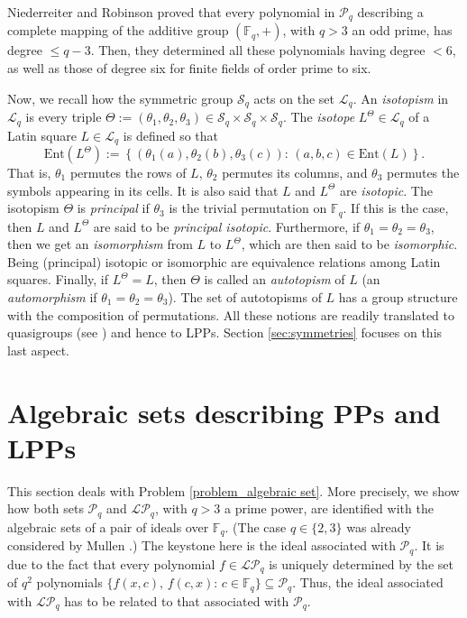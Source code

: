 \documentclass[pdflatex,sn-mathphys-num]{sn-jnl}
\theoremstyle{thmstyleone}%
\begin{document}
\vspace{0.2cm}

Niederreiter  and Robinson \cite{Niederreiter1982} proved that every polynomial in $\mathcal{P}_q$ describing a complete mapping of the additive group $(\mathbb{F}_q,+)$, with $q>3$ an odd prime, has degree $\leq q-3$. Then, they determined all these polynomials having degree $<6$, as well as those of degree six for finite fields of order prime to six. 

\vspace{0.2cm}

Now, we recall how the symmetric group $\mathcal{S}_q$ acts on the set $\mathcal{L}_q$. An {\em isotopism} in $\mathcal{L}_q$ is every triple $\Theta:=(\theta_1,\theta_2,\theta_3)\in\mathcal{S}_q\times \mathcal{S}_q\times\mathcal{S}_q$. The {\em isotope} $L^{\Theta}\in \mathcal{L}_q$ of a Latin square $L\in \mathcal{L}_q$ is defined so that
\begin{equation}\label{eq_LS_isotopic}
\mathrm{Ent}\left(L^{\Theta}\right):=\left\{(\theta_1(a),\theta_2(b),\theta_3(c))\colon\, (a,b,c)\in\mathrm{Ent}(L)\right\}.
\end{equation}
That is, $\theta_1$ permutes the rows of $L$, $\theta_2$ permutes its columns, and $\theta_3$ permutes the symbols appearing in its cells. It is also said that $L$ and $L^\Theta$ are {\em isotopic}.  The isotopism $\Theta$ is {\em principal} if $\theta_3$ is the trivial permutation on $\mathbb{F}_q$. If this is the case, then $L$ and $L^\Theta$ are said to be {\em principal isotopic}. Furthermore, if $\theta_1=\theta_2=\theta_3$, then we get an {\em isomorphism} from $L$ to $L^\Theta$, which are then said to be {\em isomorphic}.  Being (principal) isotopic or isomorphic are equivalence relations among Latin squares.  Finally, if $L^{\Theta}=L$, then $\Theta$ is called an {\em autotopism} of $L$ (an {\em automorphism} if $\theta_1=\theta_2=\theta_3$). The set of autotopisms of $L$ has a group structure with the composition of permutations. All these notions are readily translated to quasigroups (see \cite{Albert1943}) and hence to LPPs. Section \ref{sec:symmetries} focuses on this last aspect.
 
\section{Algebraic sets describing PPs and LPPs}\label{sec:description}

This section deals with Problem \ref{problem_algebraic set}. More precisely, we show how both sets $\mathcal{P}_q$ and $\mathcal{LP}_q$, with $q>3$ a prime power, are identified with the algebraic sets of a pair of ideals over $\mathbb{F}_q$. (The case $q\in \{2,3\}$ was already considered by Mullen \cite{Mullen1980}.) The keystone here is the ideal associated with $\mathcal{P}_q$. It is due to the fact that every polynomial $f\in\mathcal{LP}_q$ is uniquely determined by the set of $q^2$ polynomials $\{f(x,c),\,f(c,x)\colon\,c\in\mathbb{F}_q\}\subseteq \mathcal{P}_q$. Thus, the ideal associated with $\mathcal{LP}_q$ has to be related to that associated with $\mathcal{P}_q$.
\end{document}
